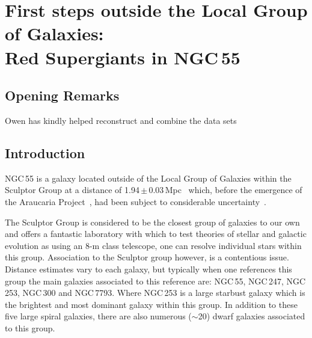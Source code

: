 \chapter{First steps outside the Local Group of Galaxies:\\
Red Supergiants in NGC\,55}\label{ch:ngc55}





\section{Opening Remarks} %
\label{sec:opening_remarks}

Owen has kindly helped reconstruct and combine the data sets


\section{Introduction} %
\label{sec:introduction}

NGC\,55 is a galaxy located outside of the Local Group of Galaxies within the Sculptor Group at a distance of 1.94\,$\pm$\,0.03\,Mpc~\citep{2006AJ....132.2556P,2008ApJ...672..266G} which, before the emergence of the Araucaria Project~\citep{2005Msngr.121...23G}, had been subject to considerable uncertainty~\citep[e.g.][]{1987ApJ...323...79P,2006A&A...455..891V}.

The Sculptor Group is considered to be the closest group of galaxies to our own and offers a fantastic laboratory with which to test theories of stellar and galactic evolution as using an 8-m class telescope, one can resolve individual stars within this group.
Association to the Sculptor group however, is a contentious issue.
Distance estimates vary to each galaxy, but typically when one references this group the main galaxies associated to this reference are: NGC\,55, NGC\,247, NGC\,253, NGC\,300 and NGC\,7793.
Where NGC\,253 is a large starbust galaxy which is the brightest and most dominant galaxy within this group.
In addition to these five large spiral galaxies, there are also numerous ($\sim$20) dwarf galaxies associated to this group.


